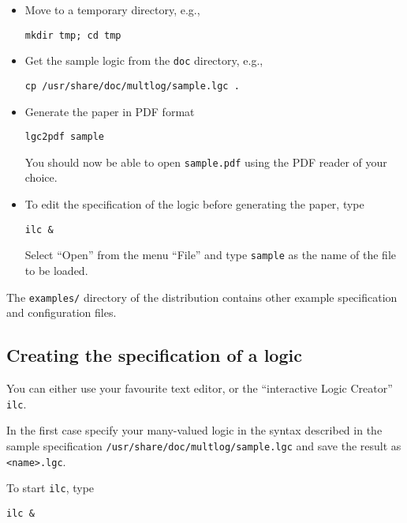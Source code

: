 \documentclass[]{article}
\begin{document}
\begin{itemize}
\item
  Move to a temporary directory, e.g.,

\begin{verbatim}
mkdir tmp; cd tmp
\end{verbatim}
\item
  Get the sample logic from the \texttt{doc} directory, e.g.,

\begin{verbatim}
cp /usr/share/doc/multlog/sample.lgc .
\end{verbatim}
\item
  Generate the paper in PDF format

\begin{verbatim}
lgc2pdf sample
\end{verbatim}

  You should now be able to open \texttt{sample.pdf} using the PDF
  reader of your choice.
\item
  To edit the specification of the logic before generating the paper,
  type

\begin{verbatim}
ilc &
\end{verbatim}

  Select ``Open'' from the menu ``File'' and type \texttt{sample} as the
  name of the file to be loaded.
\end{itemize}

The \texttt{examples/} directory of the distribution contains other
example specification and configuration files.

\hypertarget{creating-the-specification-of-a-logic}{%
\subsection{Creating the specification of a
logic}\label{creating-the-specification-of-a-logic}}

You can either use your favourite text editor, or the ``interactive
Logic Creator'' \texttt{ilc}.

In the first case specify your many-valued logic in the syntax described
in the sample specification \texttt{/usr/share/doc/multlog/sample.lgc}
and save the result as \texttt{\textless{}name\textgreater{}.lgc}.

To start \texttt{ilc}, type

\begin{verbatim}
ilc &
\end{verbatim}
\end{document}
